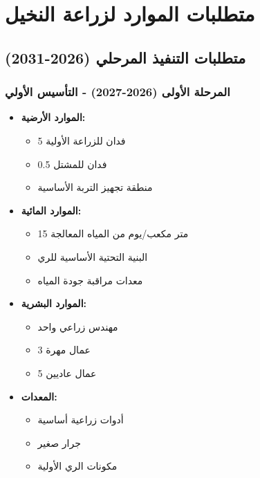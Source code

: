\section{متطلبات الموارد لزراعة النخيل}

\subsection{متطلبات التنفيذ المرحلي (2026-2031)}

\subsubsection{المرحلة الأولى (2026-2027) - التأسيس الأولي}
\begin{itemize}
    \item \textbf{الموارد الأرضية:}
    \begin{itemize}
        \item 5 فدان للزراعة الأولية
        \item 0.5 فدان للمشتل
        \item منطقة تجهيز التربة الأساسية
    \end{itemize}
    \item \textbf{الموارد المائية:}
    \begin{itemize}
        \item 15 متر مكعب/يوم من المياه المعالجة
        \item البنية التحتية الأساسية للري
        \item معدات مراقبة جودة المياه
    \end{itemize}
    \item \textbf{الموارد البشرية:}
    \begin{itemize}
        \item مهندس زراعي واحد
        \item 3 عمال مهرة
        \item 5 عمال عاديين
    \end{itemize}
    \item \textbf{المعدات:}
    \begin{itemize}
        \item أدوات زراعية أساسية
        \item جرار صغير
        \item مكونات الري الأولية
    \end{itemize}
\end{itemize}

